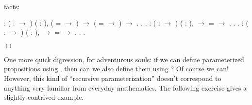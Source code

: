 \documentclass[12pt]{report}
\begin{document}
    facts: \begin{coqdoccode}
\coqdocemptyline
\coqdocnoindent
{}  : \coqdoceol
\coqdocindent{1.00em}
\coqdockw{\ensuremath{\forall}} (  :  \ensuremath{\rightarrow} ) ( : ),\coqdoceol
\coqdocindent{2.00em}
(  =  \ensuremath{\rightarrow}  ) \ensuremath{\rightarrow}\coqdoceol
\coqdocindent{2.00em}
(  =  \ensuremath{\rightarrow}  ) \ensuremath{\rightarrow}\coqdoceol
\coqdocindent{2.00em}
   .\coqdoceol
\coqdocnoindent
{}.\coqdoceol
 .\coqdoceol
\coqdocemptyline
\coqdocnoindent
{}  :\coqdoceol
\coqdocindent{1.00em}
\coqdockw{\ensuremath{\forall}} (  :  \ensuremath{\rightarrow} ) ( : ),\coqdoceol
\coqdocindent{2.00em}
    \ensuremath{\rightarrow}\coqdoceol
\coqdocindent{2.00em}
  =  \ensuremath{\rightarrow}\coqdoceol
\coqdocindent{2.00em}
 .\coqdoceol
\coqdocnoindent
{}.\coqdoceol
 .\coqdoceol
\coqdocemptyline
\coqdocnoindent
{}  :\coqdoceol
\coqdocindent{1.00em}
\coqdockw{\ensuremath{\forall}} (  :  \ensuremath{\rightarrow} ) ( : ),\coqdoceol
\coqdocindent{2.00em}
    \ensuremath{\rightarrow}\coqdoceol
\coqdocindent{2.00em}
  =  \ensuremath{\rightarrow}\coqdoceol
\coqdocindent{2.00em}
 .\coqdoceol
\coqdocnoindent
{}.\coqdoceol
 .\coqdoceol
\coqdocemptyline
\end{coqdoccode}
\ensuremath{\Box} \begin{coqdoccode}
\coqdocemptyline
\end{coqdoccode}
One more quick digression, for adventurous souls: if we can define
    parameterized propositions using , then can we also
    define them using ?  Of course we can!  However, this
    kind of ``recursive parameterization'' doesn't correspond to
    anything very familiar from everyday mathematics.  The following
    exercise gives a slightly contrived example. 
\end{document}
